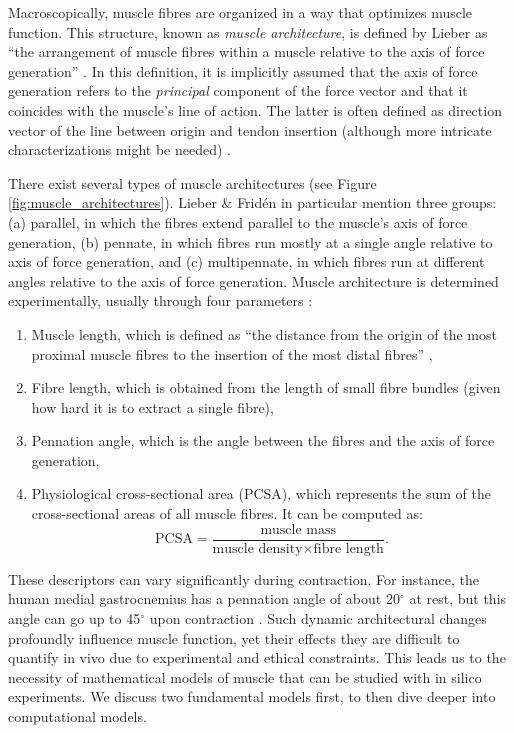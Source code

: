 \documentclass{sfuthesis}
\numberwithin{equation}{section}
\numberwithin{figure}{chapter}
\numberwithin{table}{chapter}
\theoremstyle{definition}
\begin{document}
Macroscopically, muscle fibres are organized in a way that optimizes muscle function. This structure, known as \textit{muscle architecture}, is defined by Lieber as ``the arrangement of muscle fibres within a muscle relative to the axis of force generation'' \cite{Lieber2010Book}. In this definition, it is implicitly assumed that the axis of force generation refers to the \textit{principal} component of the force vector and that it coincides with the muscle's line of action. The latter is often defined as direction vector of the line between origin and tendon insertion (although more intricate characterizations might be needed) \cite{Lee20153DPennation}.

There exist several types of muscle architectures (see Figure \ref{fig:muscle_architectures}). Lieber \& Frid\'{e}n \cite{LieberFriden2000} in particular mention three groups: (a) parallel, in which the fibres extend parallel to the muscle's axis of force generation, (b) pennate, in which fibres run mostly at a single angle relative to axis of force generation, and (c) multipennate, in which fibres run at different angles relative to the axis of force generation. Muscle architecture is determined experimentally, usually through four parameters \cite{LieberFriden2000}:
\begin{enumerate}
    \item Muscle length, which is defined as ``the distance from the origin of the most proximal muscle fibres to the insertion of the most distal fibres'' \cite{Lieber2010Book},
    \item Fibre length, which is obtained from the length of small fibre bundles (given how hard it is to extract a single fibre),
    \item Pennation angle, which is the angle between the fibres and the axis of force generation,
    \item Physiological cross-sectional area (PCSA), which represents the sum of the cross-sectional areas of all muscle fibres. It can be computed as:
    \[
        \text{PCSA} = \dfrac{\text{muscle mass}}{\text{muscle density} \times \text{fibre length}}.
    \]
\end{enumerate}

These descriptors can vary significantly during contraction. For instance, the human medial gastrocnemius has a pennation angle of about 20$^\circ$ at rest, but this angle can go up to 45$^\circ$ upon contraction \cite{LieberFriden2000}. 
Such dynamic architectural changes profoundly influence muscle function, yet their effects they are difficult to quantify in vivo due to experimental and ethical constraints. This leads us to the necessity of mathematical models of muscle that can be studied with in silico experiments. We discuss two fundamental models first, to then dive deeper into computational models.
\end{document}
